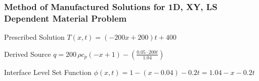 \documentclass[]{beamer}
\begin{document}
\begin{frame}[t]\frametitle{Method of Manufactured Solutions for 1D, XY, LS Dependent Material Problem}
\begin{block}{Prescribed Solution}
    $T(x,t) = (-200x+200)t + 400$
  \end{block}
  
  \begin{block}{Derived Source}
  $q = 200\,\rho c_p \left(-x+1\right) - \left(\frac{0.05 \cdot 200t}{1.04}\right)$
  \end{block}
  
  \begin{block}{Interface Level Set Function}
    $\phi(x,t) = 1 - (x - 0.04) - 0.2t = 1.04 - x - 0.2t$
  \end{block}
\end{frame}
\end{document}
